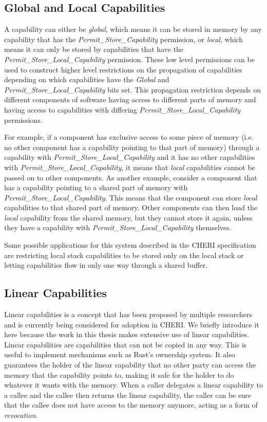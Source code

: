 \subsection{Global and Local Capabilities}
\label{sec:global}
A capability can either be \textit{global}, which means it can be stored in memory by any capability that has the \textit{Permit\_Store\_Capability} permission, or \textit{local}, which means it can only be stored by capabilities that have the \textit{Permit\_Store\_Local\_Capability} permission. These low level permissions can be used to construct higher level restrictions on the propagation of capabilities depending on which capabilities have the \textit{Global} and \textit{Permit\_Store\_Local\_Capability} bits set. This propagation restriction depends on different components of software having access to different parts of memory and having access to capabilities with differing \textit{Permit\_Store\_Local\_Capability} permissions.

For example, if a component has exclusive access to some piece of memory (i.e. no other component has a capability pointing to that part of memory) through a capability with \textit{Permit\_Store\_Local\_Capability} and it has no other capabilities with \textit{Permit\_Store\_Local\_Capability}, it means that \textit{local} capabilities cannot be passed on to other components. As another example, consider a component that has a capability pointing to a shared part of memory with \textit{Permit\_Store\_Local\_Capability}. This means that the component can store \textit{local} capabilities to that shared part of memory. Other components can then load the \textit{local} capability from the shared memory, but they cannot store it again, unless they have a capability with \textit{Permit\_Store\_Local\_Capability} themselves.

Some possible applications for this system described in the CHERI specification are restricting local stack capabilities to be stored only on the local stack or letting capabilities flow in only one way through a shared buffer.\cite{UCAM-CL-TR-951} %

\subsection{Linear Capabilities}
Linear capabilities is a concept that has been proposed by multiple researchers and is currently being considered for adoption in CHERI. We briefly introduce it here because the work in this thesis makes extensive use of linear capabilities. Linear capabilities are capabilities that can not be copied in any way.
This is useful to implement mechanisms such as Rust's ownership system.
It also guarantees the holder of the linear capability that no other party can access the memory that the capability points to, making it safe for the holder to do whatever it wants with the memory.
When a caller delegates a linear capability to a callee and the callee then returns the linear capability, the caller can be sure that the callee does not have access to the memory anymore, acting as a form of \textit{revocation}.

